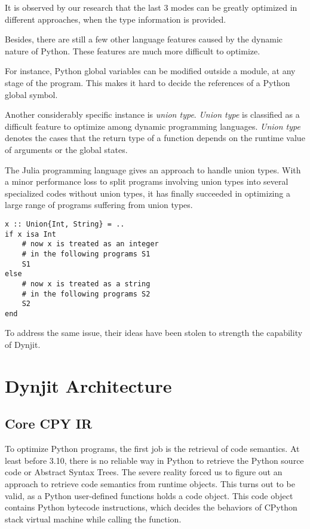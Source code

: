 \documentclass[conference]{IEEEtran}
\begin{document}
It is observed by our research that the last 3 modes can be greatly optimized in different approaches, when the type information
is provided.

Besides, there are still a few other language features caused by the dynamic nature of Python.
These features are much more difficult to optimize.

For instance, Python global variables can be modified outside a module, at any stage of the program. This makes it hard to decide the
references of a Python global symbol.

Another considerably specific instance is \textit{union type}. \textit{Union type} is classified as a difficult feature to optimize
among dynamic programming languages. \textit{Union type} denotes the cases that the return type of a function depends on the runtime
value of arguments or the global states.

The Julia programming language \cite{bezanson2017julia} gives an approach to handle union types.
With a minor performance loss to split programs involving union types into several specialized codes without union types,
it has finally succeeded in optimizing a large range of programs suffering from union types.

\lstset{language=Ruby, showlines=true, mathescape=true}
\begin{lstlisting}[caption=Union Split in Julia]
x :: Union{Int, String} = ..
if x isa Int
    # now x is treated as an integer
    # in the following programs S1
    S1
else
    # now x is treated as a string
    # in the following programs S2
    S2
end
\end{lstlisting}

To address the same issue, their ideas have been stolen to strength the capability of Dynjit.

\section{Dynjit Architecture}

\subsection{Core CPY IR}

To optimize Python programs, the first job is the retrieval of code semantics.
At least before 3.10, there is no reliable way in Python to retrieve the Python source code or Abstract Syntax Trees.
The severe reality forced us to figure out an approach to retrieve code semantics from runtime objects.
This turns out to be valid, as a Python user-defined functions holds a code object. This code object contains Python bytecode
instructions, which decides the behaviors of CPython stack virtual machine while calling the function.
\end{document}
